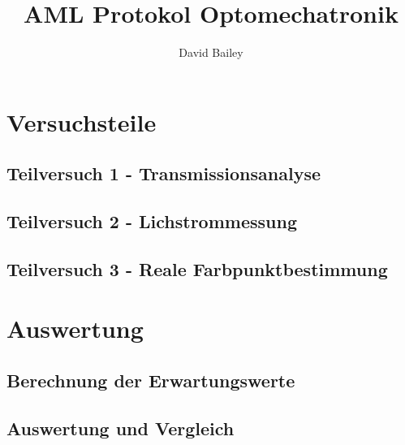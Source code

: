\documentclass[11pt,a4paper]{article}
\author{David Bailey}
\title{AML Protokol Optomechatronik}
\numberwithin{equation}{subsection}
\begin{document}



\tableofcontents
\newpage

%


\section{Versuchsteile}
\subsection{Teilversuch 1 - Transmissionsanalyse}


\newpage
\subsection{Teilversuch 2 - Lichstrommessung}


\newpage
\subsection{Teilversuch 3 - Reale Farbpunktbestimmung}


\newpage
\section{Auswertung}
\subsection{Berechnung der Erwartungswerte}

\subsection{Auswertung und Vergleich}

\newpage
\printbibliography
\end{document}
